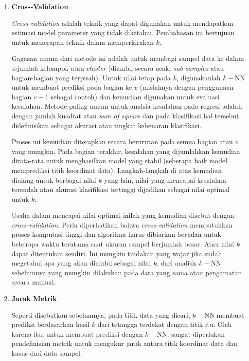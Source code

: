 \begin{subs}
\begin{enumerate}[label=\textbf{\alph*).}]
		\item \textbf{Cross-Validation}
		
		\textit{Cross-validation} adalah teknik yang dapat digunakan untuk mendapatkan estimasi model parameter yang tidak diketahui. Pembahasan ini bertujuan untuk menerapan teknik dalam memperkirakan $k$. 
		\vspace{1ex}
		
		Gagasan umum dari metode ini adalah untuk membagi sampel data ke dalam sejumlah kelompok atau \textit{cluster} (diambil secara acak, \textit{sub-samples} atau bagian-bagian yang terpisah). Untuk nilai tetap pada $k$, digunakanlah $k-$NN untuk membuat prediksi pada bagian ke $v$ (mislahnya dengan penggunaan bagian $v-1$ sebagai contoh) dan kemudian digunakan untuk evaluasi kesalahan. Metode paling umum untuk analsia kesalahan pada regresi adalah dengan jumlah kuadrat atau \textit{sum of square} dan pada klasifikasi hal tersebut didefinisikan sebagai akurasi atau tingkat kebenaran klasifikasi.
		\vspace{1ex}
		
		Proses ini kemudian diterapkan secara berurutan pada semua bagian atau $v$ yang mungkin. Pada bagian terakhir, kesalahan yang dijumlahkan kemudian dirata-rata untuk menghasilkan model yang stabil (seberapa baik model memprediksi titik koordinat data). Langkah-langkah di atas kemudian diulang untuk berbagai nilai $k$ yang lain, nilai yang mencapai kesalahan terendah atau akurasi klasifikasi tertinggi dijadikan sebagai nilai optimal untuk $k$. 
		\vspace{1ex}
		
		Usaha dalam mencapai nilai optimal inilah yang kemudian disebut dengan \textit{cross-validation}. Perlu diperhatikan bahwa \textit{cross-validation} membutuhkan proses komputasi tinggi dan algoritma harus dibiarkan berjalan untuk beberapa waktu terutama saat ukuran sampel berjumlah besar. Atau nilai $k$ dapat ditentukan sendiri. Ini mungkin tindakan yang wajar jika sudah megetahui apa yang akan diambil sebagai nilai $k$, dari analisis $k-$NN sebelumnya yang mungkin dilakukan pada data yang sama atau pengamatan secara manual.
		
		\item \textbf{Jarak Metrik}
		
		Seperti disebutkan sebelumnya, pada titik data yang dicari, $k-$NN membuat prediksi berdasarkan hasil $k$ dari tetangga terdekat dengan titik itu. Oleh karena itu, untuk membuat prediksi dengan $k-$NN, sangat diperlukan pendefinisian metrik untuk mengukur jarak antara titik koordinat data dan kasus dari data sampel. 
		\vspace{1ex}
		

\end{enumerate}
\end{subs}

